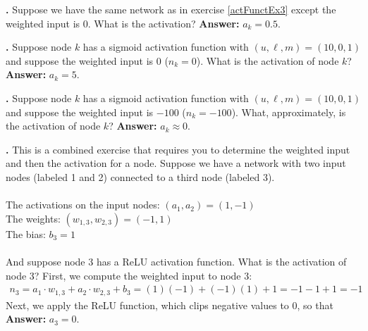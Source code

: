 \bigskip

\noindent
{\bf \theActFunctionCounter.} Suppose we have the same network as in exercise \ref{actFunctEx3} except the weighted input is $0$. What is the activation?  {\bf Answer:} $a_k = 0.5$.

\bigskip


\noindent
{\bf \theActFunctionCounter.} Suppose node $k$ has a sigmoid activation function
with $(u,\ell,m) = (10,0,1)$ and suppose the weighted input is
$0$ ($n_k = 0$). What is the activation of node $k$? {\bf Answer:} $a_k = 5$.

\bigskip


\noindent
{\bf \theActFunctionCounter.} Suppose node $k$ has a sigmoid activation function
with $(u,\ell,m) = (10,0,1)$ and suppose the weighted input is
$-100$ ($n_k = -100$). What, approximately, is the activation of node $k$? {\bf Answer:} $a_k  \approx 0$.

\bigskip

\label{actFunctEx4}
\noindent
{\bf \theActFunctionCounter.} This is a combined exercise that requires you to determine
the weighted input and then the activation for a node. Suppose we have a network with
two input nodes (labeled 1 and 2) connected to a third node (labeled 3). \\ \\
\indent \qquad\qquad The activations on the input nodes: $(a_1,a_2) = (1,-1)$\\
\indent \qquad\qquad The weights: $(w_{1,3}, w_{2,3}) = (-1,1)$ \\
\indent \qquad\qquad The bias: $b_3 = 1$ \\ \\
And suppose node 3 has a ReLU activation function. What is the
activation of node 3?  First, we compute the weighted input to node 3:
\begin{eqnarray*}
n_3 = a_1 \cdot w_{1,3}  + a_2 \cdot w_{2,3} + b_{3}
    =     (1)(-1)        +     (-1)(1)       + 1
    = -1 -1 + 1 = -1
\end{eqnarray*}
Next, we apply the ReLU function, which clips negative values to 0, so that
{\bf Answer:}  $a_3=0$.

\bigskip

